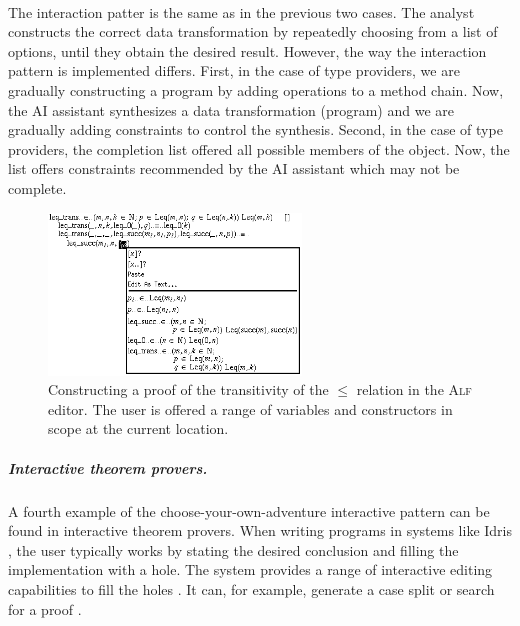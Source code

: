 \documentclass[a4paper,UKenglish,cleveref, autoref, thm-restate]{lipics-v2021}
\begin{document}
~

The interaction patter is the same as in the previous two cases. The analyst constructs the
correct data transformation by repeatedly choosing from a list of options, until they obtain
the desired result. However, the way the interaction pattern is implemented differs.
First, in the case of type providers, we are gradually constructing a program by adding operations to
a method chain. Now, the AI assistant synthesizes a data transformation (program) and we are
gradually adding constraints to control the synthesis. Second, in the case of type providers,
the completion list offered all possible members of the object. Now, the list offers
constraints recommended by the AI assistant which may not be complete.

\newpage

\begin{figure}[t]
  \includegraphics[width=0.6\textwidth]{fig/alf.png}
  \caption{Constructing a proof of the transitivity of the $\leq$ relation in the \textsc{Alf}
    editor. The user is offered a range of variables and constructors in scope at the current
    location. \cite{altenkirch-1994-alf}}
  \label{fig:alf}
\end{figure}


\subparagraph{Interactive theorem provers.}
A fourth example of the choose-your-own-adventure interactive pattern can be found in interactive
theorem provers. When writing programs in systems like Idris \cite{brady-2021-idris2}, the
user typically works by stating the desired conclusion and filling the implementation with a hole.
The system provides a range of interactive editing capabilities to fill the holes \cite{mcbride-1999-dependently}.
It can, for example, generate a case split or search for a proof \cite{brady-2015-idris}.
\end{document}
